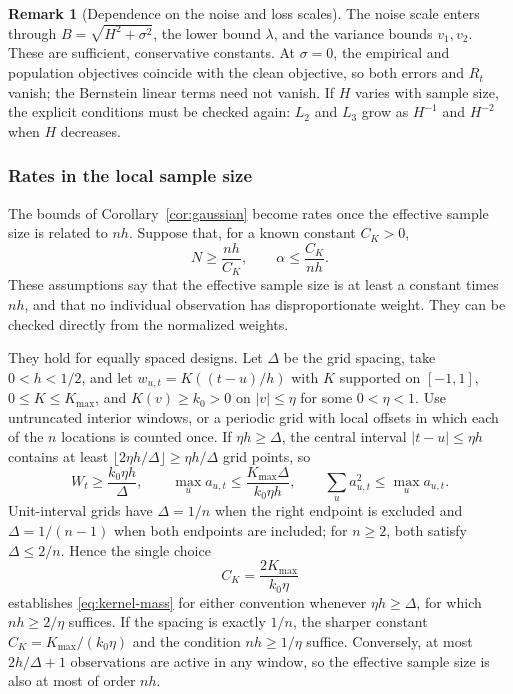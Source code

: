 \documentclass[11pt]{article}
\theoremstyle{definition}
\newtheorem*{remark}{Remark}
\begin{document}
\begin{remark}[Dependence on the noise and loss scales]
The noise scale enters through \(B=\sqrt{H^2+\sigma^2}\), the lower bound
\(\lambda\), and the variance bounds \(v_1,v_2\).  These are sufficient,
conservative constants.  At \(\sigma=0\), the empirical and population
objectives coincide with the clean objective, so both errors and \(R_t\)
vanish; the Bernstein linear terms need not vanish.  If \(H\) varies with
sample size, the explicit conditions must be checked again: \(L_2\) and
\(L_3\) grow as \(H^{-1}\) and \(H^{-2}\) when \(H\) decreases.
\end{remark}

\subsubsection{Rates in the local sample size}\label{sec:bandwidth}

The bounds of Corollary~\ref{cor:gaussian} become rates once the effective
sample size is related to \(nh\).  Suppose that, for a known constant
\(C_K>0\),
\begin{equation}
  N\geq\frac{nh}{C_K},\qquad \alpha\leq\frac{C_K}{nh}.
  \label{eq:kernel-mass}
\end{equation}
These assumptions say that the effective sample size is at least a constant
times \(nh\), and that no individual observation has disproportionate weight.
They can be checked directly from the normalized weights.

They hold for equally spaced designs.  Let \(\Delta\) be the grid spacing,
take \(0<h<1/2\), and let \(w_{u,t}=K((t-u)/h)\) with \(K\) supported on
\([-1,1]\), \(0\leq K\leq K_{\max}\), and \(K(v)\geq k_0>0\) on
\(|v|\leq\eta\) for some \(0<\eta<1\).  Use untruncated interior windows, or
a periodic grid with local offsets in which each of the \(n\) locations is
counted once.  If \(\eta h\geq\Delta\), the central interval
\(|t-u|\leq\eta h\) contains at least
\(\lfloor2\eta h/\Delta\rfloor\geq\eta h/\Delta\) grid points, so
\[
  W_t\geq\frac{k_0\eta h}{\Delta},\qquad
  \max_u a_{u,t}\leq\frac{K_{\max}\Delta}{k_0\eta h},\qquad
  \sum_u a_{u,t}^2\leq\max_u a_{u,t}.
\]
Unit-interval grids have \(\Delta=1/n\) when the right endpoint is excluded
and \(\Delta=1/(n-1)\) when both endpoints are included; for \(n\geq2\), both
satisfy \(\Delta\leq2/n\).  Hence the single choice
\[
  C_K=\frac{2K_{\max}}{k_0\eta}
\]
establishes \eqref{eq:kernel-mass} for either convention whenever
\(\eta h\geq\Delta\), for which \(nh\geq2/\eta\) suffices.  If the spacing
is exactly \(1/n\), the sharper constant \(C_K=K_{\max}/(k_0\eta)\) and the
condition \(nh\geq1/\eta\) suffice.  Conversely, at most \(2h/\Delta+1\)
observations are active in any window, so the effective sample size is also
at most of order \(nh\).
\end{document}
